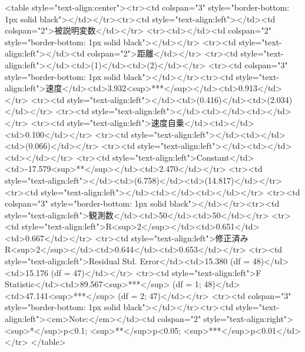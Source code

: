 
<table style="text-align:center"><tr><td colspan="3" style="border-bottom: 1px solid black"></td></tr><tr><td style="text-align:left"></td><td colspan="2">被説明変数</td></tr>
<tr><td></td><td colspan="2" style="border-bottom: 1px solid black"></td></tr>
<tr><td style="text-align:left"></td><td colspan="2">距離</td></tr>
<tr><td style="text-align:left"></td><td>(1)</td><td>(2)</td></tr>
<tr><td colspan="3" style="border-bottom: 1px solid black"></td></tr><tr><td style="text-align:left">速度</td><td>3.932<sup>***</sup></td><td>0.913</td></tr>
<tr><td style="text-align:left"></td><td>(0.416)</td><td>(2.034)</td></tr>
<tr><td style="text-align:left"></td><td></td><td></td></tr>
<tr><td style="text-align:left">速度自乗</td><td></td><td>0.100</td></tr>
<tr><td style="text-align:left"></td><td></td><td>(0.066)</td></tr>
<tr><td style="text-align:left"></td><td></td><td></td></tr>
<tr><td style="text-align:left">Constant</td><td>-17.579<sup>**</sup></td><td>2.470</td></tr>
<tr><td style="text-align:left"></td><td>(6.758)</td><td>(14.817)</td></tr>
<tr><td style="text-align:left"></td><td></td><td></td></tr>
<tr><td colspan="3" style="border-bottom: 1px solid black"></td></tr><tr><td style="text-align:left">観測数</td><td>50</td><td>50</td></tr>
<tr><td style="text-align:left">R<sup>2</sup></td><td>0.651</td><td>0.667</td></tr>
<tr><td style="text-align:left">修正済み R<sup>2</sup></td><td>0.644</td><td>0.653</td></tr>
<tr><td style="text-align:left">Residual Std. Error</td><td>15.380 (df = 48)</td><td>15.176 (df = 47)</td></tr>
<tr><td style="text-align:left">F Statistic</td><td>89.567<sup>***</sup> (df = 1; 48)</td><td>47.141<sup>***</sup> (df = 2; 47)</td></tr>
<tr><td colspan="3" style="border-bottom: 1px solid black"></td></tr><tr><td style="text-align:left"><em>Note:</em></td><td colspan="2" style="text-align:right"><sup>*</sup>p<0.1; <sup>**</sup>p<0.05; <sup>***</sup>p<0.01</td></tr>
</table>
